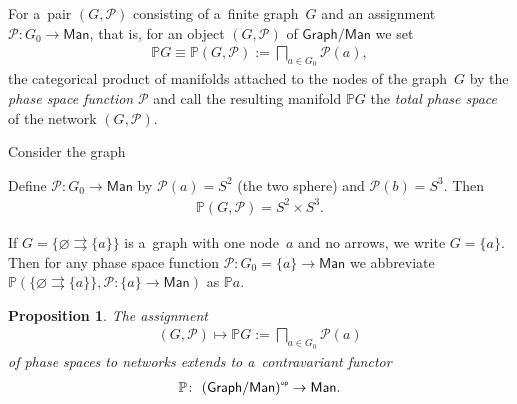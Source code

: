 \documentclass[10pt,a4paper]{amsart}
\numberwithin{equation}{section}
\newtheorem{Proposition}[Theorem]{Proposition}
{ \theoremstyle{definition}
\newtheorem{Definition}[Theorem]{Definition}
\newtheorem{Notation}[Theorem]{Notation}
\newtheorem{Example}[Theorem]{Example}
\newtheorem{Remark}[Theorem]{Remark} }
\newcommand{\op}[1]{{#1}^{\mbox{\sf{\tiny{op}}}}}
\begin{document}
\begin{Definition} For a~pair $(G,{\mathcal P})$ consisting of a~f\/inite graph~$G$ and
an assignment ${\mathcal P}\colon G_0\to \mathsf{Man}$, that is, for an object $(G,{\mathcal P})$ of
$\mathsf{Graph}/\mathsf{Man}$ we set
\begin{gather*}
\mathbb{P} G\equiv \mathbb{P} (G,{\mathcal P}):= \bigsqcap_{a\in G_0} {\mathcal P} (a),
\end{gather*}
the categorical product of manifolds attached to the nodes of the graph~$G$ by the {\it phase space function} ${\mathcal
P}$ and call the resulting manifold $\mathbb{P} G$ the {\it total phase space} of the network $(G,{\mathcal P})$.
\end{Definition}

\begin{Example}
\label{example:1}
Consider the graph


Def\/ine ${\mathcal P}\colon G_0\to \mathsf{Man}$ by ${\mathcal P}(a) = S^2$ (the two sphere) and ${\mathcal P}(b) = S^3$.
Then
\begin{gather*}
\mathbb{P} (G, {\mathcal P}) = S^2 \times S^3.
\end{gather*}
\end{Example}

\begin{Notation}
\label{notation:2.11}
If $G=\{\varnothing \rightrightarrows \{a\}\}$ is a~graph with one node~$a$ and no arrows, we write $G=\{a\}$.
Then for any phase space function ${\mathcal P}\colon G_0 =\{a\} \to \mathsf{Man}$ we abbreviate $\mathbb{P}
(\{\varnothing \rightrightarrows \{a\} \}, {\mathcal P}\colon \{a\} \to \mathsf{Man})$ as $\mathbb{P} a$.
\end{Notation}

\begin{Proposition}
\label{prop2.13}
The assignment
\begin{gather*}
(G,{\mathcal P}) \mapsto \mathbb{P} G:= \bigsqcap_{a\in G_0} {\mathcal P} (a)
\end{gather*}
of phase spaces to networks extends to a~contravariant functor
\begin{gather*}
\mathbb{P} \colon \ \op{(\mathsf{Graph}/\mathsf{Man})} \to \mathsf{Man}.
\end{gather*}
\end{Proposition}
\end{document}
